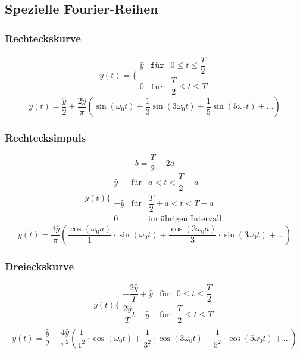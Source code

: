 \subsection{Spezielle Fourier-Reihen}
\subsubsection{Rechteckskurve}
\begin{equation}
\boxed{y\left(t\right)=\Bigg\{\begin{matrix}\hat{y}&\texttt{für}&0\leq t\leq \dfrac{T}{2}\\0&\texttt{für}&\dfrac{T}{2}\leq t\leq T\end{matrix}}
\end{equation}
\begin{equation}
\boxed{y\left(t\right)=\dfrac{\hat{y}}{2}+\dfrac{2\hat{y}}{\pi}\left(\sin\left(\omega_0t\right)+\dfrac{1}{3}\sin\left(3\omega_0t\right)+\dfrac{1}{5}\sin\left(5\omega_0t\right)+\dotso\right)}
\end{equation}
\subsubsection{Rechtecksimpuls}
\begin{equation}
\boxed{b=\dfrac{T}{2}-2a}
\end{equation}
\begin{equation}
\boxed{y\left(t\right)\Bigg\{\begin{matrix}\hat{y}&\text{für}&a<t<\dfrac{T}{2}-a\\-\hat{y}&\text{für}&\dfrac{T}{2}+a<t<T-a\\0&&\text{im übrigen Intervall}\end{matrix}}
\end{equation}
\begin{equation}
\boxed{y\left(t\right)=\dfrac{4\hat{y}}{\pi}\left(\dfrac{\cos\left(\omega_0a\right)}{1}\cdot \sin\left(\omega_0t\right)+\dfrac{\cos\left(3\omega_0a\right)}{3}\cdot \sin\left(3\omega_0t\right)+\dotso\right)}
\end{equation}
\subsubsection{Dreieckskurve}
\begin{equation}
\boxed{y\left(t\right)\Bigg\{\begin{matrix}-\dfrac{2\hat{y}}{T}+\hat{y}&\text{für}&0\leq t\leq \dfrac{T}{2}\\\dfrac{2\hat{y}}{T}t-\hat{y}&\text{für}&\dfrac{T}{2}\leq t \leq T\\\end{matrix}}
\end{equation}
\begin{equation}
\boxed{y\left(t\right)=\dfrac{\hat{y}}{2}+\dfrac{4\hat{y}}{\pi^2}\left(\dfrac{1}{1^2}\cdot\cos\left(\omega_0t\right)+\dfrac{1}{3^2}\cdot \cos\left(3\omega_0t\right)+\dfrac{1}{5^2}\cdot \cos\left(5\omega_0t\right)+\dotso\right)}
\end{equation}